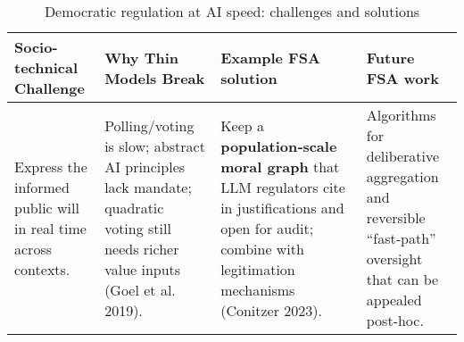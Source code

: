 \begin{table*}[!htbp]
    \centering
    \small
    \begin{tabular}{p{}p{}p{}p{}}
        \toprule
        \textbf{Socio-technical Challenge} & \textbf{Why Thin Models Break} & \textbf{Example FSA solution} & \textbf{Future FSA work} \\
        \midrule
        Express the informed public will in real time across contexts. &
        Polling/voting is slow; abstract AI principles lack mandate; quadratic voting still needs richer value inputs (Goel et al. 2019). &
        Keep a \textbf{population‑scale moral graph} \cite{klingefjord2024} that LLM regulators cite in justifications and open for audit; combine with legitimation mechanisms (Conitzer 2023). &
        Algorithms for deliberative aggregation and reversible ``fast‑path'' oversight that can be appealed post‑hoc. \\
        \bottomrule
    \end{tabular}
    \caption{Democratic regulation at AI speed: challenges and solutions}
    \label{tab:democratic-regulation}
\end{table*}